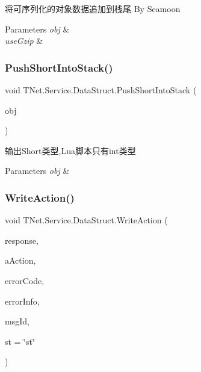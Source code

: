 将可序列化的对象数据追加到栈尾 By Seamoon 


\begin{DoxyParams}{Parameters}
{\em obj} & \\
\hline
{\em use\+Gzip} & \\
\hline
\end{DoxyParams}
\mbox{\label{class_t_net_1_1_service_1_1_data_struct_ab992444dced4bc0d37d8b243d957f295}} 
\subsubsection{\texorpdfstring{Push\+Short\+Into\+Stack()}{PushShortIntoStack()}}
{\footnotesize\ttfamily void T\+Net.\+Service.\+Data\+Struct.\+Push\+Short\+Into\+Stack (\begin{DoxyParamCaption}\item[{int}]{obj }\end{DoxyParamCaption})}



输出\+Short类型,Lua脚本只有int类型 


\begin{DoxyParams}{Parameters}
{\em obj} & \\
\hline
\end{DoxyParams}
\mbox{\label{class_t_net_1_1_service_1_1_data_struct_a6b0fbbe86eca55bb56f966f0ed128470}} 
\subsubsection{\texorpdfstring{Write\+Action()}{WriteAction()}}
{\footnotesize\ttfamily void T\+Net.\+Service.\+Data\+Struct.\+Write\+Action (\begin{DoxyParamCaption}\item[{\mbox{\hyperlink{class_t_net_1_1_service_1_1_base_game_response}{Base\+Game\+Response}}}]{response,  }\item[{int}]{a\+Action,  }\item[{int}]{error\+Code,  }\item[{string}]{error\+Info,  }\item[{int}]{msg\+Id,  }\item[{string}]{st = {\ttfamily \char`\"{}st\char`\"{}} }\end{DoxyParamCaption})}






